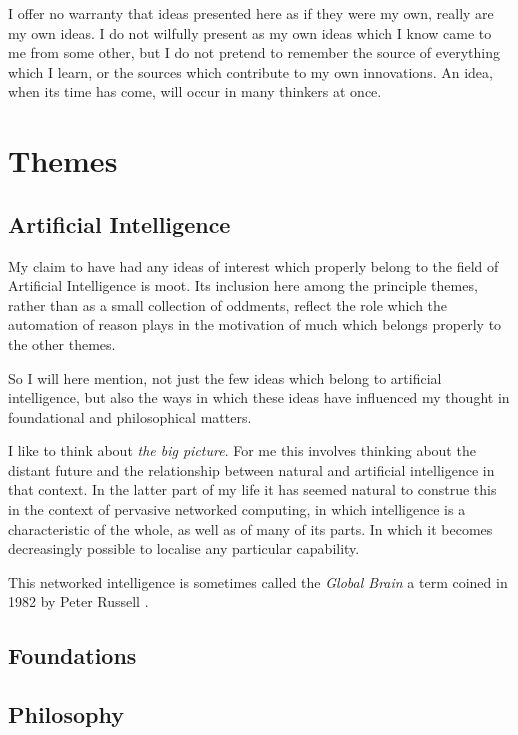 \documentclass[10pt,titlepage]{book}
\begin{document}
I offer no warranty that ideas presented here as if they were my own, really are my own ideas.
I do not wilfully present as my own ideas which I know came to me from some other, but I do not pretend to remember the source of everything which I learn, or the sources which contribute to my own innovations.
An idea, when its time has come, will occur in many thinkers at once.

\part{Themes}

\chapter{Artificial Intelligence}

My claim to have had any ideas of interest which properly belong to the field of Artificial Intelligence is moot.
Its inclusion here among the principle themes, rather than as a small collection of oddments, reflect the role which the automation of reason plays in the motivation of much which belongs properly to the other themes.

So I will here mention, not just the few ideas which belong to artificial intelligence, but also the ways in which these ideas have influenced my thought in foundational and philosophical matters.

I like to think about {\it the big picture}.
For me this involves thinking about the distant future and the relationship between natural and artificial intelligence in that context.
In the latter part of my life it has seemed natural to construe this in the context of pervasive networked computing, in which intelligence is a characteristic of the whole, as well as of many of its parts.
In which it becomes decreasingly possible to localise any particular capability.

This networked intelligence is sometimes called the {\it Global Brain} a term coined in 1982 by Peter Russell \cite{russellp82}.

\chapter{Foundations}

\chapter{Philosophy}
\end{document}
